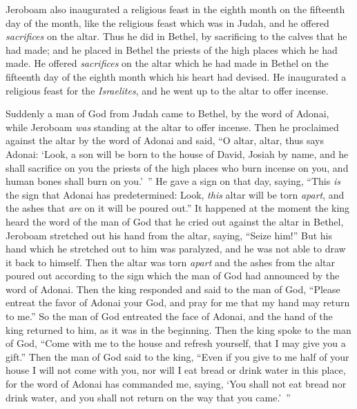 \begin{biblechapter}
\verse Jeroboam also inaugurated a religious feast in the eighth month on the fifteenth day of the month, like the religious feast which was in Judah, and he offered \textit{sacrifices} on the altar. Thus he did in Bethel, by sacrificing to the calves that he had made; and he placed in Bethel the priests of the high places which he had made.
\verse He offered \textit{sacrifices} on the altar which he had made in Bethel on the fifteenth day of the eighth month which his heart had devised. He inaugurated a religious feast for the \textit{Israelites}, and he went up to the altar to offer incense.
\end{biblechapter}

\begin{biblechapter} %
 Suddenly a man of God from Judah came to Bethel, by the word of Adonai, while Jeroboam \textit{was} standing at the altar to offer incense.
\verse Then he proclaimed against the altar by the word of Adonai and said, “O altar, altar, thus says Adonai: ‘Look, a son will be born to the house of David, Josiah by name, and he shall sacrifice on you the priests of the high places who burn incense on you, and human bones shall burn on you.’ ”
\verse He gave a sign on that day, saying, “This \textit{is} the sign that Adonai has predetermined: Look, \textit{this} altar will be torn \textit{apart}, and the ashes that \textit{are} on it will be poured out.”
\verse It happened at the moment the king heard the word of the man of God that he cried out against the altar in Bethel, Jeroboam stretched out his hand from the altar, saying, “Seize him!” But his hand which he stretched out to him was paralyzed, and he was not able to draw it back to himself.
\verse Then the altar was torn \textit{apart} and the ashes from the altar poured out according to the sign which the man of God had announced by the word of Adonai.
\verse Then the king responded and said to the man of God, “Please entreat the favor of Adonai your God, and pray for me that my hand may return to me.” So the man of God entreated the face of Adonai, and the hand of the king returned to him, as it was in the beginning.
\verse Then the king spoke to the man of God, “Come with me to the house and refresh yourself, that I may give you a gift.”
\verse Then the man of God said to the king, “Even if you give to me half of your house I will not come with you, nor will I eat bread or drink water in this place,
\verse for the word of Adonai has commanded me, saying, ‘You shall not eat bread nor drink water, and you shall not return on the way that you came.’ ”

\end{biblechapter}
